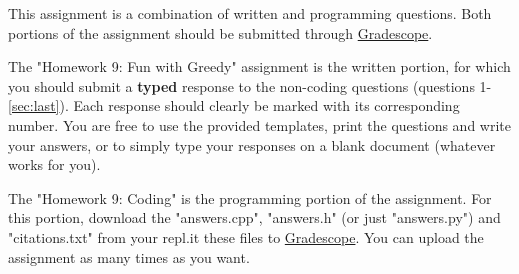 \documentclass [12pt]{article}
\begin{document}
This assignment is a combination of written and programming questions. Both portions of the assignment should be submitted through \href{https://www.gradescope.com/courses/350304}{Gradescope}.

The "Homework 9: Fun with Greedy" assignment is the written portion, for which you should submit a \textbf{typed} response to the non-coding questions (questions 1-\ref{sec:last}). Each response should clearly be marked with its corresponding number. You are free to use the provided templates, print the questions and write your answers, or to simply type your responses on a blank document (whatever works for you).

The "Homework 9: Coding" is the programming portion of the assignment. For this portion, download the "answers.cpp", "answers.h" (or just "answers.py") and "citations.txt" from your repl.it these files to \href{https://www.gradescope.com/courses/350304}{Gradescope}. You can upload the assignment as many times as you want.
\end{document}
